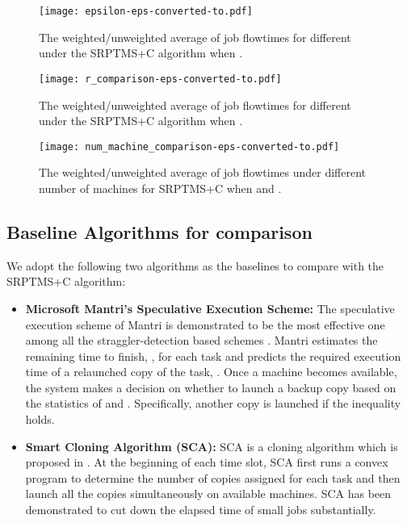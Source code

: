 \documentclass[10pt,conference,compsocconf,letterpaper]{IEEEtran}
\begin{document}
\begin{figure*}
\centering
\begin{minipage}{.32\textwidth}
\centering
\texttt{[image: epsilon-eps-converted-to.pdf]}
\caption{The weighted/unweighted average of job flowtimes for different  under the SRPTMS+C algorithm when .}
\label{epsilon}
\end{minipage}\hfill
\begin{minipage}{.32\textwidth}
\centering
\texttt{[image: r\_comparison-eps-converted-to.pdf]}
\caption{The weighted/unweighted average of job flowtimes for different  under the SRPTMS+C algorithm when .}
\label{r}
\end{minipage}\hfill
\begin{minipage}{.32\textwidth}
\centering
\texttt{[image: num\_machine\_comparison-eps-converted-to.pdf]}
\caption{The weighted/unweighted average of job flowtimes under different number of machines for SRPTMS+C when  and .}
\label{num}
\end{minipage}
\vspace{-0.8em}
\end{figure*}




\subsection{Baseline Algorithms for comparison}
We adopt the following two algorithms as the baselines to compare with the SRPTMS+C algorithm:

\begin{itemize}
\item \textbf{Microsoft Mantri's Speculative Execution Scheme:} The speculative execution scheme of Mantri is demonstrated to be the most effective one among all the straggler-detection based schemes \cite{Outliers}. Mantri estimates  the remaining time to finish, , for each task and predicts the required execution time of a relaunched copy of the task, . Once a machine becomes available, the system makes a decision on whether to launch a backup copy based on the statistics of  and . Specifically, another copy is launched if the inequality  holds.
\item \textbf{Smart Cloning Algorithm (SCA):} SCA is a cloning algorithm which is proposed in \cite{speculative-multiple-optimization}. At the beginning of each time slot, SCA first runs a convex program to determine the number of copies assigned for each task and then launch all the copies simultaneously on available machines.  SCA has been demonstrated to cut
down the elapsed time of small jobs substantially.\end{itemize}
\end{document}
